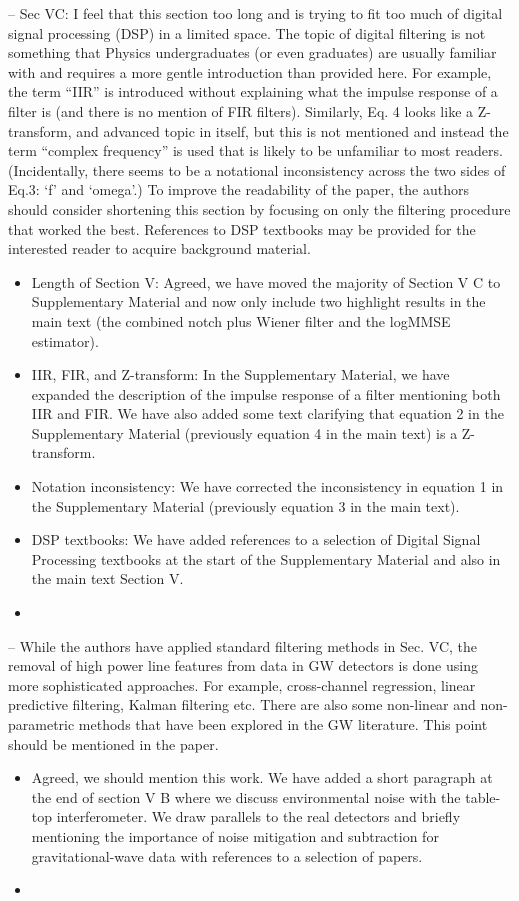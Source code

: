 \documentclass{article}
\begin{document}
\noindent
-- Sec VC: I feel that this section too long and is trying to fit too much of digital signal processing (DSP) in a limited space. The topic of digital filtering is not something that Physics undergraduates (or even graduates) are usually familiar with and requires a more gentle introduction than provided here. For example, the term ``IIR'' is introduced without explaining what the impulse response of a filter is (and there is no mention of FIR filters). Similarly, Eq. 4 looks like a Z-transform, and advanced topic in itself, but this is not mentioned and instead the term ``complex frequency'' is used that is likely to be unfamiliar to most readers. (Incidentally, there seems to be a notational inconsistency across the two sides of Eq.3: `f' and `omega'.) To improve the readability of the paper, the authors should consider shortening this section by focusing on only the filtering procedure that worked the best. References to DSP textbooks may be provided for the interested reader to acquire background material. 
\begin{itemize}
\item Length of Section V: Agreed, we have moved the majority of Section V C to Supplementary Material and now only include two highlight results in the main text (the combined notch plus Wiener filter and the logMMSE estimator). 
\item IIR, FIR, and Z-transform: In the Supplementary Material, we have expanded the description of the impulse response of a filter mentioning both IIR and FIR. We have also added some text clarifying that equation 2 in the Supplementary Material (previously equation 4 in the main text) is a Z-transform. 
\item Notation inconsistency: We have corrected the inconsistency in equation 1 in the Supplementary Material (previously equation 3 in the main text). 
\item DSP textbooks: We have added references to a selection of Digital Signal Processing textbooks at the start of the Supplementary Material and also in the main text Section V.
\item[]
\end{itemize}

\noindent
-- While the authors have applied standard filtering methods in Sec. VC, the removal of high power line features from data in GW detectors is done using more sophisticated approaches. For example, cross-channel regression, linear predictive filtering, Kalman filtering etc. There are also some non-linear and non-parametric methods that have been explored in the GW literature. This point should be mentioned in the paper.
\begin{itemize}
\item Agreed, we should mention this work. We have added a short paragraph at the end of section V B where we discuss environmental noise with the table-top interferometer. We draw parallels to the real detectors and briefly mentioning the importance of noise mitigation and subtraction for gravitational-wave data with references to a selection of papers.
\item[]
\end{itemize}
\end{document}
